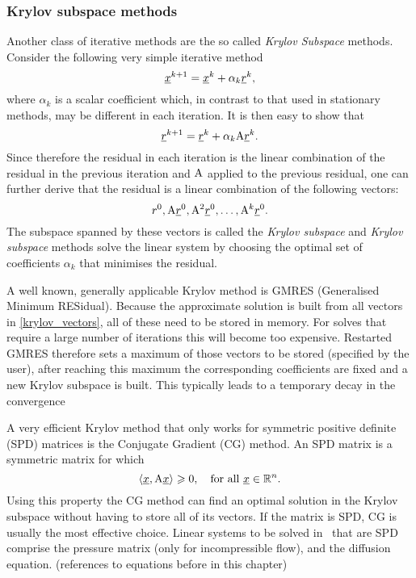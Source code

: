 \subsubsection{Krylov subspace methods} \label{sec:krylov_subspace_methods}
Another class of iterative methods are the so called 
\emph{Krylov Subspace} methods. Consider the following very 
simple iterative method
\begin{equation*}
  \underline{x}^{k+1}=\underline{x}^k + \alpha_k \underline{r}^k,
\end{equation*}
where $\alpha_k$ is a scalar coefficient which, 
in contrast to that used in stationary methods, may be different in each 
iteration. It is then easy to show that
\begin{equation*}
  \underline{r}^{k+1}=\underline{r}^k+\alpha_k \mathrm{A}\underline{r}^k.
\end{equation*}
Since therefore the residual in each iteration is the linear 
combination of the residual in the previous iteration and $\mathrm{A}$ 
applied to the previous residual, one can further derive that the 
residual is a linear combination of the following vectors:
\begin{equation}\label{krylov_vectors}
  r^0, \mathrm{A}\underline{r}^{0}, \mathrm{A}^2\underline{r}^0, \ldots, \mathrm{A}^k\underline{r}^0.
\end{equation}
The subspace spanned by these vectors is called the \emph{Krylov subspace} 
and \emph{Krylov subspace} methods solve the linear system by choosing 
the optimal set of coefficients $\alpha_k$ that minimises the residual.

A well known, generally applicable Krylov method is GMRES 
(Generalised Minimum RESidual). Because the approximate solution 
is built from all vectors in \eqref{krylov_vectors}, all of these need
to be stored in memory. For solves that require a large number of 
iterations this will become too expensive. Restarted GMRES therefore sets
a maximum of those vectors to be stored (specified by the user), 
after reaching this maximum the corresponding coefficients are fixed 
and a new Krylov subspace is built. This typically leads to a 
temporary decay in the convergence

A very efficient Krylov method that only works for symmetric 
positive definite (SPD) matrices is the Conjugate 
Gradient (CG) method. An SPD matrix is a symmetric matrix for which
\begin{equation*}
  \langle \underline{x}, \mathrm{A}\underline{x}\rangle \geqslant 0, \quad \text{for all }\underline{x}\in\mathbb{R}^n.
\end{equation*}
Using this property the CG method can find an optimal solution 
in the Krylov subspace without having to store all of its 
vectors. If the matrix is SPD, CG is usually the most 
effective choice. Linear systems to be solved in \fluidity\ that are SPD 
comprise the pressure matrix (only for incompressible flow), and the 
diffusion equation. (references to equations before in this chapter)


